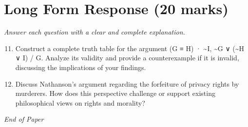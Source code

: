\documentclass[12pt]{article}
\begin{document}
\section*{Long Form Response (20 marks)}
\textit{Answer each question with a clear and complete explanation.}
\begin{enumerate}[label=\arabic*.]
\setcounter{enumi}{10}
\item Construct a complete truth table for the argument (G ≡ H) · \textasciitilde{}I, \textasciitilde{}G ∨ (\textasciitilde{}H ∨ I) / G. Analyze its validity and provide a counterexample if it is invalid, discussing the implications of your findings.
\item Discuss Nathanson's argument regarding the forfeiture of privacy rights by murderers. How does this perspective challenge or support existing philosophical views on rights and morality?
\end{enumerate}

\vfill
\noindent\textit{End of Paper}
\end{document}
